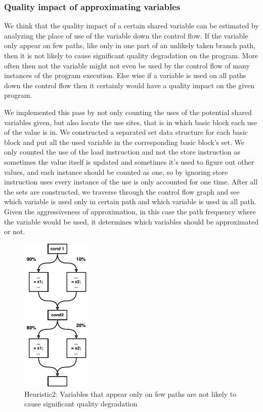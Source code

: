 \documentclass[12pt,conference]{IEEEtran}
\begin{document}
\subsubsection{Quality impact of approximating variables}

We think that the quality impact of a certain shared variable can be estimated
by analyzing the place of use of the variable down the control flow. If the 
variable only appear on few paths, like only in one part of an unlikely taken
branch path, then it is not likely to cause significant quality degradation
on the program. More often then not the variable might not even be used by the
control flow of many instances of the program execution. Else wise if a variable
is used on all paths down the control flow then it certainly would have a
quality impact on the given program.

We implemented this pass by not only counting the uses of the potential shared
variables given, but also locate the use sites, that is in which basic block each
use of the value is in. We constructed a separated set data structure for each 
basic block and put all the used variable in the corresponding basic block's set.
We only counted the use of the load instruction and not the store instruction as 
sometimes the value itself is updated and sometimes it's used to figure out other
values, and each instance should be counted as one, so by ignoring store instruction
uses every instance of the use is only accounted for one time. After all the sets
are constructed, we traverse through the control flow graph and see which variable
is used only in certain path and which variable is used in all path. Given the
aggressiveness of approximation, in this case the path frequency where the variable
would be used, it determines which variables should be approximated or not.

\begin{figure}[h]
    \centering
    \includegraphics[width=0.30\textwidth]{Heuristic2.pdf}
    \caption{Heuristic2: Variables that appear only on few paths are not likely to cause significant quality degradation}
    \label{fig:h2}
\end{figure}
\end{document}
